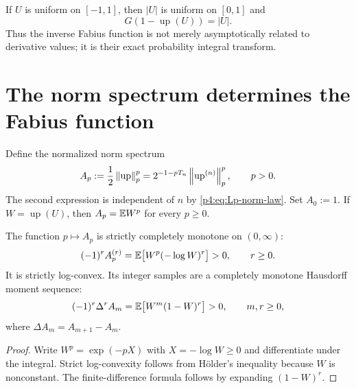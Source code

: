 \documentclass[11pt,oneside]{article}
\theoremstyle{definition}
\theoremstyle{remark}
\newcommand{\Up}{\operatorname{up}}
\begin{document}
\begin{remark}
If $U$ is uniform on $[-1,1]$, then $|U|$ is uniform on $[0,1]$ and
\begin{equation}
 G\!\left(1-\Up(U)\right)=|U|.
 \label{p4:eq:quantile-coupling}
\end{equation}
Thus the inverse Fabius function is not merely asymptotically related to derivative values;
it is their exact probability integral transform.
\end{remark}

\section{The norm spectrum determines the Fabius function}
\label{p4:sec:hausdorff}

Define the normalized norm spectrum
\begin{equation}
 A_p:=\frac12\norm{\Up}_p^p
 =2^{-1-pT_n}\norm{\Up^{(n)}}_p^p,
 \qquad p>0.
 \label{p4:eq:Ap-definition}
\end{equation}
The second expression is independent of $n$ by \eqref{p4:eq:Lp-norm-law}.
Set $A_0:=1$.  If $W=\Up(U)$, then $A_p=\mathbb E W^p$ for every $p\geq0$.

\begin{proposition}
\label{p4:prop:complete-monotonicity}
The function $p\mapsto A_p$ is strictly completely monotone on $(0,\infty)$:
\begin{equation}
 (-1)^rA_p^{(r)}
 =\mathbb E\bigl[W^p(-\log W)^r\bigr]>0,
 \qquad r\geq0.
 \label{p4:eq:continuous-complete-monotonicity}
\end{equation}
It is strictly log-convex.  Its integer samples are a completely monotone Hausdorff moment
sequence:
\begin{equation}
 (-1)^r\Delta^r A_m
 =\mathbb E\bigl[W^m(1-W)^r\bigr]>0,
 \qquad m,r\geq0,
 \label{p4:eq:discrete-complete-monotonicity}
\end{equation}
where $\Delta A_m=A_{m+1}-A_m$.
\end{proposition}

\begin{proof}
Write $W^p=\exp(-pX)$ with $X=-\log W\geq0$ and differentiate under the integral.
Strict log-convexity follows from H\"older's inequality because $W$ is nonconstant.
The finite-difference formula follows by expanding $(1-W)^r$.
\end{proof}
\end{document}
